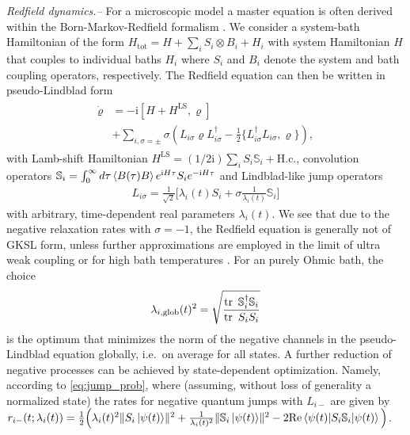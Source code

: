 \documentclass[twocolumn,prl,superscriptaddress]{revtex4-2}
\renewcommand{\i}{\mathrm i}
\begin{document}
\textit{Redfield dynamics.--} For a microscopic model a master equation is often derived within the Born-Markov-Redfield formalism \cite{Strunz20,Archak22}. We consider a system-bath Hamiltonian of the form $H_\mathrm{tot} = H + \sum_i S_i \otimes B_i + H_i$ with system Hamiltonian $H$ that couples to individual baths $H_i$ where $S_i$ and $B_i$ denote the system and bath coupling operators, respectively. The Redfield equation can then be written in pseudo-Lindblad form \cite{TBecker2021}
\begin{align}
	\begin{aligned}
		\dot \varrho &= - \i[H + H^{\mathrm{LS}}, \varrho] \\ &+  \sum\limits_{i,\sigma=\pm} \sigma \left( L_{i\sigma} \varrho L_{i\sigma}^\dagger - \frac{1}{2} \{ L_{i\sigma}^\dagger L_{i\sigma},\varrho \} \right) ,
	\end{aligned}
\end{align}
with Lamb-shift Hamiltonian $H^\mathrm{LS}= (1/2\i) \sum_i S_i\mathbb{S}_i + \text{H.c.}$, convolution operators $\mathbb{S}_i=\int_0^\infty  d \tau \expval{B(\tau)B} e^{\mathrm{i}H \tau} S_i e^{-\i H \tau}$ and Lindblad-like jump operators
\begin{align}
	L_{i\sigma} = \frac{1}{\sqrt 2} \Bigg[ \lambda_{i}(t) S_i + \sigma \frac{1}{\lambda_{i}(t)} \mathbb{S}_i \Bigg]
\end{align} 
with arbitrary, time-dependent real parameters $\lambda_{i}(t)$.
We see that due to the negative relaxation rates with $\sigma=-1$, the Redfield equation is generally not of GKSL form, unless further approximations are employed in the limit of ultra weak coupling \cite{breuerpetruccione,Archak22,Strunz20} or for high bath temperatures \cite{HWichterich2007,TBecker2021}. 
For an purely Ohmic bath, the choice~\cite{TBecker2021}
\begin{align}
	\lambda_{i, \mathrm{glob}}(t)^2 = \sqrt \frac{\tr\ \mathbb{S}_i^\dagger \mathbb{S}_i}{\tr\ S_i S_i}
\end{align}
is the optimum that minimizes the norm of the negative channels in the pseudo-Lindblad equation globally, i.e.~on average for all states. A further reduction of negative processes can be achieved by state-dependent optimization. Namely, according to \cref{eq:jump_prob}, where (assuming, without loss of generality a normalized state) the rates for negative quantum jumps with $L_{i-}$ are given by $	r_{i-}(t;\lambda_i(t)) = \frac{1}{2} \Big( \lambda_i(t)^2 \lVert S_i \ket{\psi(t)}\rVert^2 + \frac{1}{\lambda_i(t)^2} \lVert \mathbb{S}_i \ket{\psi(t)}\rVert^2 - 2\mathrm{Re} \expval{S_i \mathbb{S}_i}{\psi(t)}  \Big)$.
\end{document}
